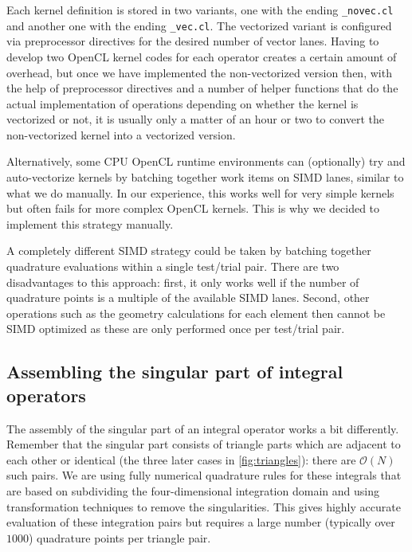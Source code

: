Each kernel definition is stored in two variants, one with the ending \texttt{\_novec.cl} and another one with the ending \texttt{\_vec.cl}. The vectorized variant is configured via preprocessor directives for the desired number of vector lanes. Having to develop two OpenCL kernel codes for each operator creates a certain amount of overhead, but once we have implemented the non-vectorized version then, with the help of preprocessor directives and a number of helper functions that do the actual implementation of operations depending on whether the kernel is vectorized or not, it is usually only a matter of an hour or two to convert the non-vectorized kernel into a vectorized version.

Alternatively, some CPU OpenCL runtime environments can (optionally) try and auto-vectorize kernels by batching together work items on SIMD lanes, similar to what we do manually. In our experience, this works well for very simple kernels but often fails for more complex OpenCL kernels. This is why we decided to implement this strategy manually.

A completely different SIMD strategy could be taken by batching together quadrature evaluations within a single test/trial pair. There are two disadvantages to this approach: first, it only works well if the number of quadrature points is a multiple of the available SIMD lanes. Second, other operations such as the geometry calculations for each element then cannot be SIMD optimized as these are only performed once per test/trial pair.

\subsection{Assembling the singular part of integral operators}
The assembly of the singular part of an integral operator works a bit differently. Remember that the singular part consists of triangle parts which are adjacent to each other or identical (the three later cases in \cref{fig:triangles}): there are $\mathcal{O}(N)$ such pairs. We are using fully numerical quadrature rules for these integrals that are based on subdividing the four-dimensional integration domain and using transformation techniques to remove the singularities. This gives highly accurate evaluation of these integration pairs but requires a large number (typically over $1000$) quadrature points per triangle pair.


